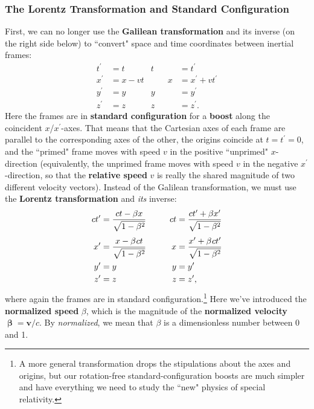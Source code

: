 \documentclass[12pt]{article}
\renewcommand{\vv}[1]{\mathbf{#1}}
\newcommand{\vvbeta}{\bm{\upbeta}}
\begin{document}
\subsubsection{The Lorentz Transformation and Standard Configuration}\label{sssec:lt}
First, we can no longer use the \textbf{Galilean transformation} and its inverse (on the right side below) to ``convert" space and time coordinates between inertial frames:
\begin{equation*}
\begin{aligned}
t^{\prime} &= t& t&= t^\prime \\
x^{\prime} &= x - vt& \qquad x &= x^\prime + vt^\prime\\
y^{\prime} &= y& y&= y^\prime\\
z^{\prime} &= z& z&= z^\prime .
\end{aligned}
\end{equation*}
Here the frames are in \textbf{standard configuration} for a \textbf{boost} along the coincident $x$/$x^\prime$-axes. That means that the Cartesian axes of each frame are parallel to the corresponding axes of the other, the origins coincide at $t=t^\prime=0$, and the ``primed" frame moves with speed $v$ in the positive ``unprimed" $x$-direction (equivalently, the unprimed frame moves with speed $v$ in the negative $x^\prime$-direction, so that the \textbf{relative speed} $v$ is really the shared magnitude of two different velocity vectors). Instead of the Galilean transformation, we must use the \textbf{Lorentz transformation} and \emph{its} inverse:
\begin{equation}\label{eq:lt}
\begin{aligned}
ct^{\prime} &= \dfrac{ct - \beta x}{\sqrt{1- \beta ^2}}& ct &= \dfrac{ct^\prime + \beta x^\prime}{\sqrt{1- \beta ^2}} \\[3pt]
x^{\prime} &= \dfrac{x - \beta \mkern1mu c t}{\sqrt{1- \beta ^2}}& \qquad x &= \dfrac{x^\prime + \beta \mkern1mu c t^\prime}{\sqrt{1- \beta ^2}}\\
y^{\prime} &= y& y&= y^\prime \\
z^{\prime} &= z& z&= z^\prime,
\end{aligned}
\end{equation}
where again the frames are in standard configuration.\footnote{A more general transformation drops the stipulations about the axes and origins, but our rotation-free standard-configuration boosts are much simpler and have everything we need to study the ``new" physics of special relativity.} Here we've introduced the \textbf{normalized speed} $\beta$, which is the magnitude of the \textbf{normalized velocity} $\vvbeta=\vv v/c$. By \emph{normalized}, we mean that $\beta$ is a dimensionless number between 0 and 1.
\end{document}
